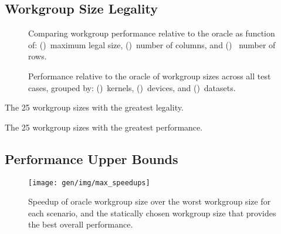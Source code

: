 \subsection{Workgroup Size Legality}


\cleardoublepage
\begin{figure}

\caption{%
  Comparing workgroup performance relative to the oracle as function
  of: ()~maximum legal size,
  ()~number of columns, and
  ()~ number of rows.%
}
\label{fig:performance-wgsizes}
\end{figure}
\newpage
\begin{figure}

\caption{%
  Performance relative to the oracle of workgroup sizes across all
  test cases, grouped by: ()~kernels,
  ()~devices, and
  ()~datasets.%
}
\label{fig:performances}
\end{figure}

%


\begin{table}
  \parbox{.45\linewidth}{
    \centering
    \scriptsize
    
    \caption{The 25 workgroup sizes with the greatest legality.}
  }
  \hfill
  \parbox{.45\linewidth}{
    \centering
    \scriptsize
    
    \caption{The 25 workgroup sizes with the greatest performance.}
  }
\end{table}


\subsection{Performance Upper Bounds}

\begin{figure}
\texttt{[image: gen/img/max\_speedups]}
\caption{%
  Speedup of oracle workgroup size over the worst workgroup size for
  each scenario, and the statically chosen workgroup size that
  provides the best overall performance.%
}
\label{fig:speedups}
\end{figure}

